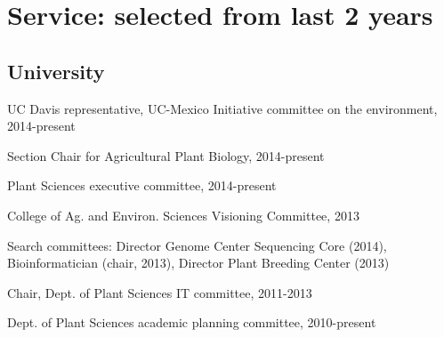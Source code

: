 \documentclass[letterpaper]{article}
\renewenvironment{itemize}{
  \begin{list}{}{
    \setlength{\leftmargin}{1.5em}
  }
}{
  \end{list}
}
\begin{document}
\section*{Service: selected from last 2 years}
\begin{itemize}
\subsection*{University}
\item UC Davis representative, UC-Mexico Initiative committee on the environment, 2014-present 
\item Section Chair for Agricultural Plant Biology, 2014-present
\item Plant Sciences executive committee, 2014-present
\item College of Ag. and Environ. Sciences Visioning Committee, 2013
\item Search committees: Director Genome Center Sequencing Core (2014), Bioinformatician (chair, 2013), Director Plant Breeding Center (2013)
\item Chair, Dept. of Plant Sciences IT committee, 2011-2013
\item Dept. of Plant Sciences academic planning committee, 2010-present


\end{itemize}
\end{document}

